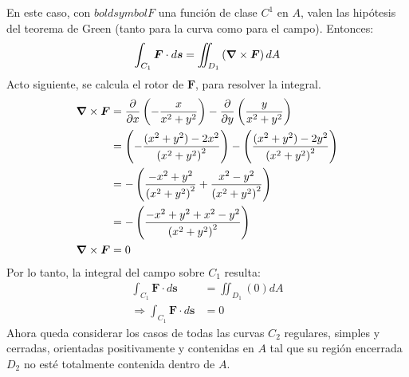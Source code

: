 \begin{solution}
\begin{center}
\begin{tikzpicture}
        \end{tikzpicture}
    \end{center}
    En este caso, con $boldsymbol{F}$ una función de clase
    $C^1$ en $A$, valen las hipótesis del teorema de Green (tanto para la curva como para el campo). Entonces:
    \begin{equation*}
        \int_{C_1}\boldsymbol{F}\cdot d\boldsymbol{s} = \iint_{D_1}\left(\grad \times \boldsymbol{F}\right)dA
    \end{equation*}
    Acto siguiente, se calcula el rotor de $\boldsymbol{F}$, para resolver la integral.
    \begin{align*}
        \grad \times \boldsymbol{F} &= \partialx\left( -\frac{x}{x^2+y^2}\right) - \partialy\left(\frac{y}{x^2+y^2}\right)\\
        &= \left(-\frac{(x^2+y^2)-2x^2}{\left(x^2+y^2\right)^2}\right) - \left(\frac{(x^2+y^2)-2y^2}{\left(x^2+y^2\right)^2}\right)\\
        &= -\left(\frac{-x^2+y^2}{\left(x^2+y^2\right)^2}+\frac{x^2-y^2}{\left(x^2+y^2\right)^2}\right)\\
        &= -\left(\frac{-x^2+y^2+x^2-y^2}{\left(x^2+y^2\right)^2}\right)\\
        \grad \times \boldsymbol{F}&= 0
    \end{align*}
    Por lo tanto, la integral del campo sobre $C_1$ resulta:
    \begin{align*}
        \int_{C_1}\boldsymbol{F}\cdot d\boldsymbol{s} &= \iint_{D_1}\left(0\right)dA\\
        \Rightarrow \int_{C_1}\boldsymbol{F}\cdot d\boldsymbol{s} &= 0
    \end{align*}
    Ahora queda considerar los casos de todas las curvas $C_2$ regulares, simples y cerradas, orientadas positivamente
    y contenidas en $A$ tal que su región encerrada $D_2$ no esté totalmente contenida dentro de $A$.
    \begin{center}
\end{center}
\end{solution}
